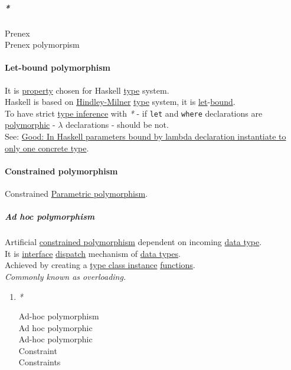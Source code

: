 \documentclass[11pt]{article}
\begin{document}
\subparagraph{\emph{*}}
\label{sec:orgd727272}

\label{org5d4f543}Prenex\\
\label{orge933298}Prenex polymorpism\\

\paragraph{\label{org63025f0}Let-bound polymorphism}
\label{sec:org42508ad}
It is \hyperref[orgf8c3cc7]{property} chosen for Haskell \hyperref[orgc4aea2f]{type} system.\\
Haskell is based on \hyperref[org45f61be]{Hindley-Milner} \hyperref[orgc4aea2f]{type} system, it is \hyperref[org77c82c3]{let}-\hyperref[orgaac83d9]{bound}.\\
To have strict \hyperref[orgf93c945]{type inference} with \emph{*} - if \texttt{let} and \texttt{where} declarations are \hyperref[orgac4d581]{polymorphic} - \(\lambda\) declarations - should be not.\\

See: \hyperref[org92471fa]{Good: In Haskell parameters bound by lambda declaration instantiate to only one concrete type}.\\

\paragraph{\label{org6108cfd}Constrained polymorphism}
\label{sec:org7785999}
Constrained \hyperref[org3c0b242]{Parametric polymorphism}.\\

\subparagraph{\label{org5f41089}Ad hoc polymorphism}
\label{sec:orgb1664e9}
Artificial \hyperref[org6108cfd]{constrained polymorphism} dependent on incoming \hyperref[org212d9c3]{data type}.\\
It is \hyperref[orgf9bdf66]{interface} \hyperref[org4a11068]{dispatch} mechanism of \hyperref[org5c444ae]{data types}.\\
Achieved by creating a \hyperref[org5d45c00]{type class instance} \hyperref[orgaa8fb87]{functions}.\\

\emph{Commonly known as overloading.}\\

\begin{enumerate}
\item \emph{*}
\label{sec:org406fdf9}

\label{orgceb9f3d}Ad-hoc polymorphism\\
\label{orgbb95e9a}Ad hoc polymorphic\\
\label{orgee827c3}Ad-hoc polymorphic\\
\label{org180980d}Constraint\\
\label{orgcddf7a9}Constraints\\
\end{enumerate}
\end{document}
